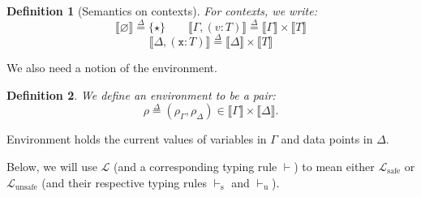 \documentclass[preprint]{uai2026} %
\newtheorem{definition}{Definition}
\newcommand{\emptyctx}{\varnothing}
\newcommand{\sem}[1]{\llbracket #1 \rrbracket}
\newcommand{\Lsafe}{\mathcal{L}_{\text{safe}}}
\newcommand{\Lunsafe}{\mathcal{L}_{\text{unsafe}}}
\newcommand{\kto}{\rightsquigarrow}
\newcommand{\safevdash}{\vdash_{\text{s}}}
\newcommand{\unsafevdash}{\vdash_{\text{u}}}
\newcommand{\df}{\overset{\Delta}{=}}
\newcommand{\datavar}[1]{\mathtt{#1}}
\newcommand{\Meas}{\mathsf{Meas}}
\begin{document}
\begin{definition}[Semantics on contexts]\label{def:sem-ctx}
For contexts, we write:
\[
\sem{\emptyctx} \df \{\star\}
\qquad
\sem{\Gamma,(v:T)} \df \sem{\Gamma}\times \sem{T}
\]
\[
\sem{\Delta,(\datavar{x}:T)} \df \sem{\Delta}\times \sem{T}
\]
\end{definition}

We also need a notion of the environment.
\begin{definition}
We define an environment to be a pair:
\[
\rho \df (\rho_\Gamma,\rho_\Delta)\in \sem{\Gamma}\times \sem{\Delta}.
\]
\end{definition}
Environment holds the current values of variables in $\Gamma$ and data points in $\Delta$.

Below, we will use $\mathcal{L}$ (and a corresponding typing rule $\vdash$) to mean either $\Lsafe$ or $\Lunsafe$ (and their respective typing rules $\safevdash$ and $\unsafevdash$).
\end{document}
